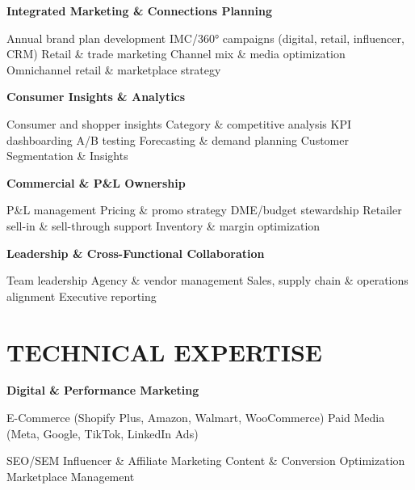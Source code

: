 \documentclass[10pt,letterpaper]{article}
\begin{document}
\textbf{Integrated Marketing \& Connections Planning}

\begin{subitemize}
\item Annual brand plan development \textbar{} IMC/360° campaigns (digital, retail, influencer, CRM) \textbar{} Retail \& trade marketing \textbar{} Channel mix \& media optimization \textbar{} Omnichannel retail \& marketplace strategy
\end{subitemize}

\textbf{Consumer Insights \& Analytics}

\begin{subitemize}
\item Consumer and shopper insights \textbar{} Category \& competitive analysis \textbar{} KPI dashboarding \textbar{} A/B testing \textbar{} Forecasting \& demand planning \textbar{} Customer Segmentation \& Insights
\end{subitemize}

\textbf{Commercial \& P\&L Ownership}

\begin{subitemize}
\item P\&L management \textbar{} Pricing \& promo strategy \textbar{} DME/budget stewardship \textbar{} Retailer sell-in \& sell-through support \textbar{} Inventory \& margin optimization
\end{subitemize}

\textbf{Leadership \& Cross-Functional Collaboration}

\begin{subitemize}
\item Team leadership \textbar{} Agency \& vendor management \textbar{} Sales, supply chain \& operations alignment \textbar{} Executive reporting
\end{subitemize}

\section*{TECHNICAL EXPERTISE}

\textbf{Digital \& Performance Marketing}

\begin{subitemize}
\item E-Commerce (Shopify Plus, Amazon, Walmart, WooCommerce) \textbar{} Paid Media (Meta, Google, TikTok, LinkedIn Ads)
\item SEO/SEM \textbar{} Influencer \& Affiliate Marketing \textbar{} Content \& Conversion Optimization \textbar{} Marketplace Management
\end{subitemize}
\end{document}
